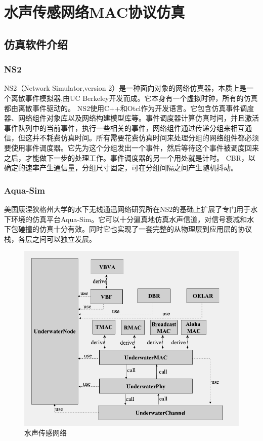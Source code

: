 \chapter{水声传感网络MAC协议仿真}
\section {仿真软件介绍}
\subsection{NS2}
NS2（Network Simulator,version 2）是一种面向对象的网络仿真器，本质上是一个离散事件模拟器,由UC Berkeley开发而成。它本身有一个虚拟时钟，所有的仿真都由离散事件驱动的。
NS2使用C++和Otcl作为开发语言。它包含仿真事件调度器、网络组件对象库以及网络构建模型库等。事件调度器计算仿真时间，并且激活事件队列中的当前事件，执行一些相关的事件，网络组件通过传递分组来相互通信，但这并不耗费仿真时间。所有需要花费仿真时间来处理分组的网络组件都必须要使用事件调度器。它先为这个分组发出一个事件，然后等待这个事件被调度回来之后，才能做下一步的处理工作。事件调度器的另一个用处就是计时。
CBR，以确定的速率产生通信量，分组尺寸固定，可在分组间隔之间产生随机抖动。
\subsection{Aqua-Sim}
 美国康涅狄格州大学的水下无线通迅网络研究所在NS2的基础上扩展了专门用于水下环境的仿真平台Aqua-Sim。它可以十分逼真地仿真水声信道，对信号衰减和水下包碰撞的仿真十分有效。同时它也实现了一套完整的从物理层到应用层的协议栈，各层之间可以独立发展。
 \begin{figure}[ht]
 	\centering
 	\includegraphics[scale=0.5]{figures/aq.png}
 	\caption{
 		水声传感网络
 	}
 	\label{fig:example}
 \end{figure}
